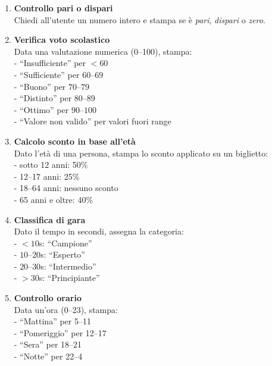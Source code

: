 \documentclass{article}
\begin{document}
\begin{enumerate}
    \item \textbf{Controllo pari o dispari} \\
    Chiedi all'utente un numero intero e stampa se è \textit{pari}, \textit{dispari} o \textit{zero}.
    
    \item \textbf{Verifica voto scolastico} \\
    Data una valutazione numerica (0--100), stampa: \\
    \quad - ``Insufficiente'' per $<60$ \\
    \quad - ``Sufficiente'' per $60$--$69$ \\
    \quad - ``Buono'' per $70$--$79$ \\
    \quad - ``Distinto'' per $80$--$89$ \\
    \quad - ``Ottimo'' per $90$--$100$ \\
    \quad - ``Valore non valido'' per valori fuori range
    
    \item \textbf{Calcolo sconto in base all'età} \\
    Dato l'età di una persona, stampa lo sconto applicato su un biglietto: \\
    \quad - sotto 12 anni: 50\% \\
    \quad - 12--17 anni: 25\% \\
    \quad - 18--64 anni: nessuno sconto \\
    \quad - 65 anni e oltre: 40\%
    
    \item \textbf{Classifica di gara} \\
    Dato il tempo in secondi, assegna la categoria: \\
    \quad - $<10$s: ``Campione'' \\
    \quad - $10$--$20$s: ``Esperto'' \\
    \quad - $20$--$30$s: ``Intermedio'' \\
    \quad - $>30$s: ``Principiante''
    
    \item \textbf{Controllo orario} \\
    Data un'ora (0--23), stampa: \\
    \quad - ``Mattina'' per 5--11 \\
    \quad - ``Pomeriggio'' per 12--17 \\
    \quad - ``Sera'' per 18--21 \\
    \quad - ``Notte'' per 22--4
    

\end{enumerate}
\end{document}
